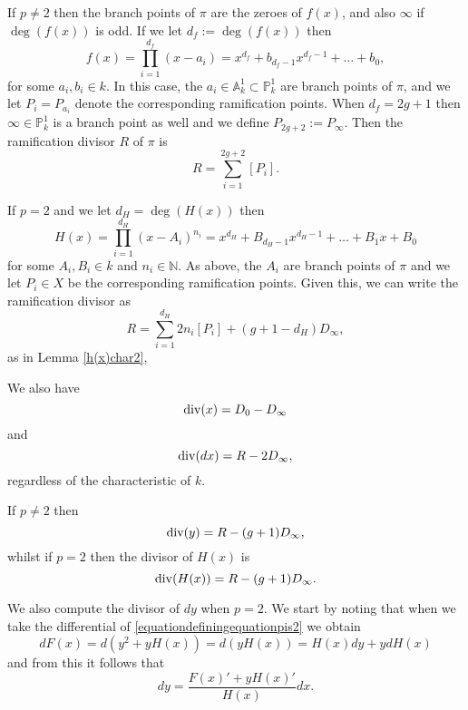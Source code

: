 If $p \neq 2$ then the branch points of $\pi$ are the zeroes of $f(x)$, and also $\infty$ if $\deg(f(x))$ is odd.
If we let $d_f:=\deg(f(x))$ then 
    \begin{equation}\label{equationexpansionoff(x)}
    f(x) = \prod_{i=1}^{d_f} (x-a_i) = x^{d_f} + b_{d_f - 1}x^{d_f-1} + \ldots + b_0,
    \end{equation}
for some $a_i, b_i \in k$.
In this case, the $a_i \in \mathbb A_k^1 \subset \mathbb P_k^1$ are branch points of $\pi$, and we let $P_i = P_{a_i}$ denote the corresponding ramification points.
When $d_f = 2g+1$ then $\infty \in \mathbb P_k^1$ is a branch point as well and we define $P_{2g+2} := P_\infty$.
Then the ramification divisor $R$ of $\pi$ is
    \[
    R = \sum_{i=1}^{2g+2} [P_i] .
    \]

If $p=2$ and we let $d_H = \deg(H(x))$ then
    \begin{equation}\label{equationcapitalh}
    H(x) = \prod_{i=1}^{d_H} (x-A_i)^{n_i} = x^{d_H} + B_{{d_H}-1}x^{{d_H}-1} + \ldots + B_1x + B_0
    \end{equation}
for some $A_i, B_i \in  k$ and $n_i \in \mathbb N$.
As above, the $A_i$ are branch points of $\pi$ and we let $P_i \in X$ be the corresponding ramification points.
Given this, we can write the ramification divisor as
    \[
    R = \sum_{i=1}^{d_H} 2n_i[P_i] + (g+1-{d_H})D_\infty,
    \]
as in Lemma \ref{h(x)char2}, 

We also have
    \begin{equation}\label{equationdivxpis2}
    \operatorname{div} (x)  = D_0 - D_\infty
    \end{equation}
and
    \begin{equation}\label{equationdifferentialdivisor}
    \operatorname{div}(dx) = R - 2D_\infty,
    \end{equation}
regardless of the characteristic of $k$.

If $p \neq 2$ then 
    \begin{equation}\label{equationdivisorofypnot2}
    \operatorname{div}(y)  = R - (g+1)D_\infty,
    \end{equation}
whilst if $p=2$ then the divisor of $H(x)$ is
    \begin{equation}\label{equationdivisorofH}
    \operatorname{div} (H(x))  = R - (g+1)D_\infty. 
    \end{equation}



We also compute the divisor of $dy$ when $p=2$.
We start by noting that when we take the differential of \eqref{equationdefiningequationpis2} we obtain
    \[
    dF(x) = d\left(y^2 + yH(x) \right) = d(yH(x)) = H(x)dy + ydH(x)
    \]
and from this it follows that
    \begin{equation}\label{equationdivisorofdypis2}
    dy = \frac{F(x)'+yH(x)'}{H(x)}dx.
    \end{equation}

